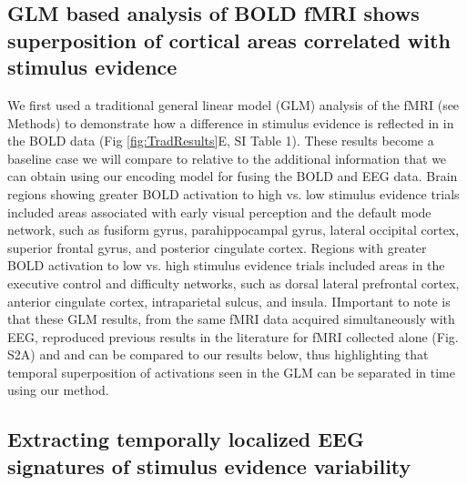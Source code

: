 \subsection*{GLM based analysis of BOLD fMRI shows superposition of cortical areas correlated with stimulus evidence}

We first used a traditional general linear model (GLM) analysis of the fMRI (see Methods) to demonstrate how a difference in stimulus evidence is reflected in in the BOLD data (Fig \ref{fig:TradResults}E, SI Table 1). These results become a baseline case we will compare to relative to the additional information that we can obtain using our encoding model for fusing the BOLD and EEG data. Brain regions showing greater BOLD activation to high vs. low stimulus evidence trials included areas associated with early visual perception and the default mode network, such as fusiform gyrus, parahippocampal gyrus, lateral occipital cortex, superior frontal gyrus, and posterior cingulate cortex. Regions with greater BOLD activation to low vs. high stimulus evidence trials included areas in the executive control and difficulty networks, such as dorsal lateral prefrontal cortex, anterior cingulate cortex, intraparietal sulcus, and insula. IImportant to note is that these GLM results, from the same fMRI data acquired simultaneously with EEG, reproduced previous results in the literature for fMRI collected alone \cite{Heekeren2004}(Fig. S2A) and and can be compared to our results below, thus highlighting that temporal superposition of activations seen in the GLM can be separated in time using our method.

\subsection*{Extracting temporally localized EEG signatures of stimulus evidence variability}

